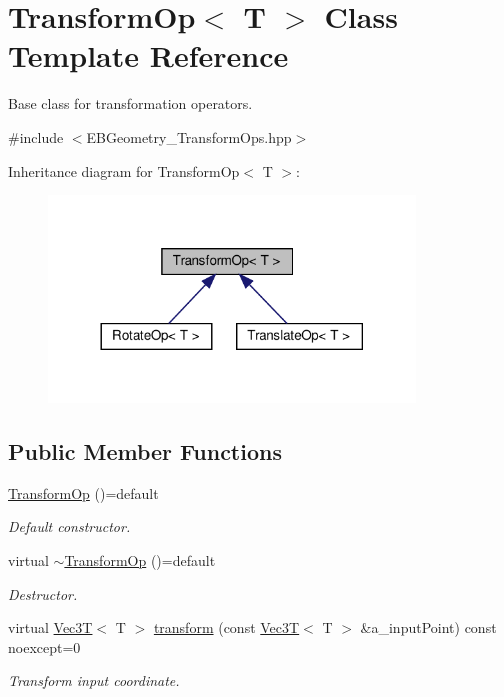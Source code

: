 \hypertarget{classTransformOp}{}\section{Transform\+Op$<$ T $>$ Class Template Reference}
\label{classTransformOp}


Base class for transformation operators.  




{\ttfamily \#include $<$E\+B\+Geometry\+\_\+\+Transform\+Ops.\+hpp$>$}



Inheritance diagram for Transform\+Op$<$ T $>$\+:
\nopagebreak
\begin{figure}[H]
\begin{center}
\leavevmode
\includegraphics[width=276pt]{classTransformOp__inherit__graph}
\end{center}
\end{figure}
\subsection*{Public Member Functions}
\begin{DoxyCompactItemize}
\item 
\mbox{\label{classTransformOp_ab904cbdd373ca07e08b254163331b3b4}} 
\hyperlink{classTransformOp_ab904cbdd373ca07e08b254163331b3b4}{Transform\+Op} ()=default
\begin{DoxyCompactList}\small\item\em Default constructor. \end{DoxyCompactList}\item 
\mbox{\label{classTransformOp_a556cc7f5bbe70ce148a0791b883eb58c}} 
virtual \hyperlink{classTransformOp_a556cc7f5bbe70ce148a0791b883eb58c}{$\sim$\+Transform\+Op} ()=default
\begin{DoxyCompactList}\small\item\em Destructor. \end{DoxyCompactList}\item 
virtual \hyperlink{classVec3T}{Vec3T}$<$ T $>$ \hyperlink{classTransformOp_a61c1920daa9f55fd2ea9095cbcfa18b8}{transform} (const \hyperlink{classVec3T}{Vec3T}$<$ T $>$ \&a\+\_\+input\+Point) const noexcept=0
\begin{DoxyCompactList}\small\item\em Transform input coordinate. \end{DoxyCompactList}\end{DoxyCompactItemize}



